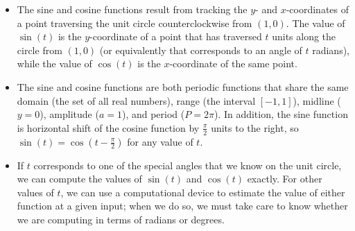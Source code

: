 \documentclass[nooutcomes]{ximera}
\begin{document}

\begin{summary}
\begin{itemize}[label=\textbullet]
\item
The sine and cosine functions result from tracking the \(y\)- and \(x\)-coordinates of a point traversing the unit circle counterclockwise from \((1,0)\).  The value of \(\sin(t)\) is the \(y\)-coordinate of a point that has traversed \(t\) units along the circle from \((1,0)\) (or equivalently that corresponds to an angle of \(t\) radians), while the value of \(\cos(t)\) is the \(x\)-coordinate of the same point.%
\item
The sine and cosine functions are both periodic functions that share the same domain (the set of all real numbers), range (the interval \([-1,1]\)), midline (\(y = 0\)), amplitude (\(a = 1\)), and period (\(P = 2\pi\)).  In addition, the sine function is horizontal shift of the cosine function by \(\frac{\pi}{2}\) units to the right, so \(\sin(t) = \cos\left(t-\frac{\pi}{2}\right)\) for any value of \(t\).%
\item
If \(t\) corresponds to one of the special angles that we know on the unit circle, we can compute the values of \(\sin(t)\) and \(\cos(t)\) exactly.  For other values of \(t\), we can use a computational device to estimate the value of either function at a given input; when we do so, we must take care to know whether we are computing in terms of radians or degrees.%
\end{itemize}
\end{summary}
\end{document}
